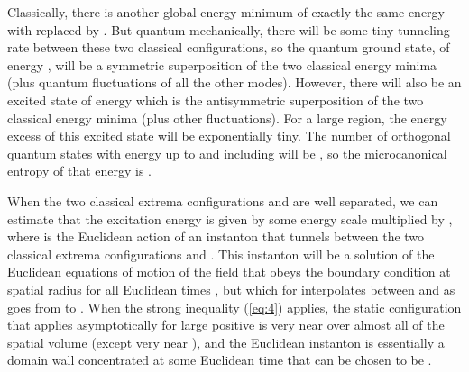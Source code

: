 \documentclass[a4paper,12pt]{article}
\begin{document}
	Classically, there is another global
energy minimum of exactly the same energy
with \coordHE{} replaced by \coordHE{}.
But quantum mechanically, there will be some
tiny tunneling rate between these two classical
configurations, so the quantum ground state,
of energy \coordHE{},
will be a symmetric superposition of the two
classical energy minima (plus quantum fluctuations
of all the other modes).
However, there will also be an excited state
of energy \coordHE{} which is the antisymmetric
superposition of the two classical energy minima
(plus other fluctuations).
For a large region, the energy excess \coordHE{}
of this excited state will be exponentially tiny.
The number of orthogonal quantum states
with energy up to and including \coordHE{} will be
\coordHE{}, so the microcanonical entropy
of that energy is \coordHE{}.

	When the two classical extrema configurations
\coordHE{} and \coordHE{} are well separated,
we can estimate that the excitation energy \coordHE{}
is given by some energy scale multiplied by \coordHE{},
where \coordHE{} is the Euclidean action of an instanton
that tunnels between the two classical extrema
configurations \coordHE{} and \coordHE{}.
This instanton will be a solution of the Euclidean
equations of motion of the field \myHighlight{$\phi$}\coordHE{} that
obeys the boundary condition \coordHE{} at
spatial radius \coordHE{} for all Euclidean times \myHighlight{$\tau$}\coordHE{},
but which for \coordHE{} interpolates between
\coordHE{} and \coordHE{} as \myHighlight{$\tau$}\coordHE{}
goes from \myHighlight{$-\infty$}\coordHE{} to \myHighlight{$+\infty$}\coordHE{}.
When the strong inequality (\ref{eq:4}) applies,
the static configuration \coordHE{}
that applies asymptotically for large positive \myHighlight{$\tau$}\coordHE{}
is very near \coordHE{} over almost all of the
spatial volume (except very near \coordHE{}), and
the Euclidean instanton is essentially a domain
wall concentrated at some Euclidean time that can
be chosen to be \coordHE{}.
\end{document}

